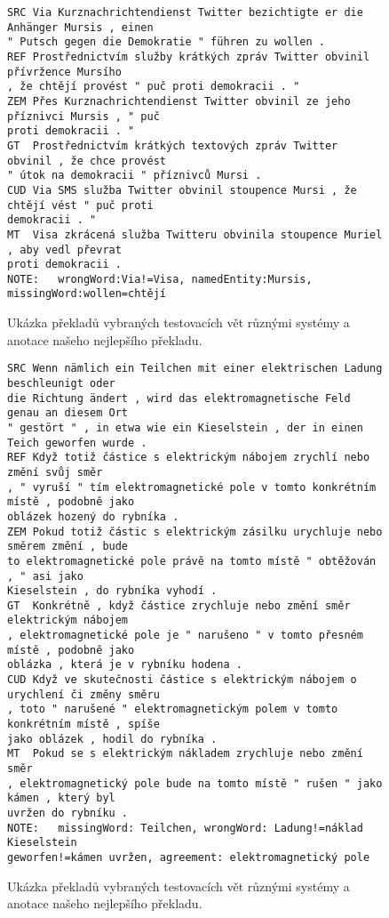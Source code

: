 \documentclass[a4]{article}
\begin{document}
\begin{figure}[t]
\centering
\begin{verbatim}
SRC	Via Kurznachrichtendienst Twitter bezichtigte er die Anhänger Mursis , einen
" Putsch gegen die Demokratie " führen zu wollen .
REF	Prostřednictvím služby krátkých zpráv Twitter obvinil přívržence Mursího
, že chtějí provést " puč proti demokracii . "
ZEM	Přes Kurznachrichtendienst Twitter obvinil ze jeho příznivci Mursis , " puč
proti demokracii . "
GT	Prostřednictvím krátkých textových zpráv Twitter obvinil , že chce provést
" útok na demokracii " příznivců Mursi .
CUD	Via SMS služba Twitter obvinil stoupence Mursi , že chtějí vést " puč proti
demokracii . "
MT	Visa zkrácená služba Twitteru obvinila stoupence Muriel , aby vedl převrat
proti demokracii .
NOTE:	wrongWord:Via!=Visa, namedEntity:Mursis, missingWord:wollen=chtějí
\end{verbatim}
\caption{Ukázka překladů vybraných testovacích vět různými systémy a anotace našeho nejlepšího překladu.}
\label{fig:preklad2}
\end{figure}

\begin{figure}[t]
\centering
\begin{verbatim}
SRC	Wenn nämlich ein Teilchen mit einer elektrischen Ladung beschleunigt oder
die Richtung ändert , wird das elektromagnetische Feld genau an diesem Ort
" gestört " , in etwa wie ein Kieselstein , der in einen Teich geworfen wurde .
REF	Když totiž částice s elektrickým nábojem zrychlí nebo změní svůj směr
, " vyruší " tím elektromagnetické pole v tomto konkrétním místě , podobně jako
oblázek hozený do rybníka .
ZEM	Pokud totiž částic s elektrickým zásilku urychluje nebo směrem změní , bude
to elektromagnetické pole právě na tomto místě " obtěžován , " asi jako
Kieselstein , do rybníka vyhodí .
GT	Konkrétně , když částice zrychluje nebo změní směr elektrickým nábojem
, elektromagnetické pole je " narušeno " v tomto přesném místě , podobně jako
oblázka , která je v rybníku hodena .
CUD	Když ve skutečnosti částice s elektrickým nábojem o urychlení či změny směru
, toto " narušené " elektromagnetickým polem v tomto konkrétním místě , spíše
jako oblázek , hodil do rybníka .
MT	Pokud se s elektrickým nákladem zrychluje nebo změní směr
, elektromagnetický pole bude na tomto místě " rušen " jako kámen , který byl
uvržen do rybníku .
NOTE:	missingWord: Teilchen, wrongWord: Ladung!=náklad Kieselstein
geworfen!=kámen uvržen, agreement: elektromagnetický pole
\end{verbatim}
\caption{Ukázka překladů vybraných testovacích vět různými systémy a anotace našeho nejlepšího překladu.}
\label{fig:preklad3}
\end{figure}
\end{document}
